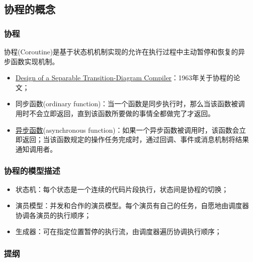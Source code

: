 \subsection{协程的概念}
% 
\begin{frame}[fragile]
    \frametitle{协程}
% 
协程(Coroutine)是基于状态机机制实现的允许在执行过程中主动暂停和恢复的异步函数实现机制。

    \begin{itemize}
        \item \href{http://melconway.com/Home/pdf/compiler.pdf}{Design of a Separable Transition-Diagram Compiler}：1963年关于协程的论文； \pause
        \item 同步函数(ordinary function)：当一个函数是同步执行时，那么当该函数被调用时不会立即返回，直到该函数所要做的事情全都做完了才返回。
        \item \href{https://www.cnblogs.com/balingybj/p/4780442.html}{异步函数}(asynchronous function)：如果一个异步函数被调用时，该函数会立即返回；当该函数规定的操作任务完成时，通过回调、事件或消息机制将结果通知调用者。
    \end{itemize}

% 

\end{frame}
\begin{frame}[fragile]
    \frametitle{协程的模型描述}

    \begin{itemize}
        \item 状态机：每个状态是一个连续的代码片段执行，状态间是协程的切换； \pause
        \item 演员模型：并发和合作的演员模型。每个演员有自己的任务，自愿地由调度器协调各演员的执行顺序； \pause
        \item 生成器：可在指定位置暂停的执行流，由调度器遍历协调执行顺序；
    \end{itemize}
\end{frame}
% 
\begin{frame}
\frametitle{提纲} %
\tableofcontents %
\end{frame}
